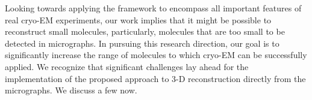 \documentclass[9pt,twocolumn,twoside,lineno]{pnas-new}
\begin{document}
Looking towards applying the framework to encompass all important features of real cryo-EM experiments, our work implies that it might be possible to reconstruct small molecules, particularly, molecules that are too small to be detected in micrographs. 
In pursuing this research direction, our goal is to significantly increase the range of molecules to which cryo-EM can be successfully applied.
We recognize that significant challenges lay ahead for the implementation of the proposed approach to 3-D reconstruction directly from the micrographs. We discuss a few now.


%



%


\end{document}
